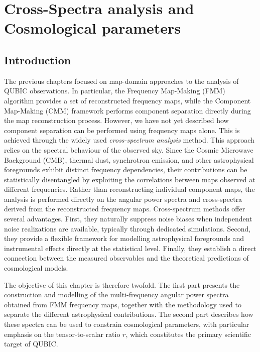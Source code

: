 \documentclass[../../thesis.tex]{subfiles}
\begin{document}
 
\chapter{Cross-Spectra analysis and Cosmological parameters} \label{chap:xspectrum}

\ifSubfilesClassLoaded{
    \tableofcontents
}{
    \minitoc
}

\section*{Introduction}

The previous chapters focused on map-domain approaches to the analysis of QUBIC observations. In particular, the Frequency Map-Making (FMM) algorithm provides a set of reconstructed frequency maps, while the Component Map-Making (CMM) framework performs component separation directly during the map reconstruction process. However, we have not yet described how component separation can be performed using frequency maps alone. This is achieved through the widely used \emph{cross-spectrum analysis} method.
This approach relies on the spectral behaviour of the observed sky. Since the Cosmic Microwave Background (CMB), thermal dust, synchrotron emission, and other astrophysical foregrounds exhibit distinct frequency dependencies, their contributions can be statistically disentangled by exploiting the correlations between maps observed at different frequencies. Rather than reconstructing individual component maps, the analysis is performed directly on the angular power spectra and cross-spectra derived from the reconstructed frequency maps.
Cross-spectrum methods offer several advantages. First, they naturally suppress noise biases when independent noise realizations are available, typically through dedicated simulations. Second, they provide a flexible framework for modelling astrophysical foregrounds and instrumental effects directly at the statistical level. Finally, they establish a direct connection between the measured observables and the theoretical predictions of cosmological models.

The objective of this chapter is therefore twofold. The first part presents the construction and modelling of the multi-frequency angular power spectra obtained from FMM frequency maps, together with the methodology used to separate the different astrophysical contributions. The second part describes how these spectra can be used to constrain cosmological parameters, with particular emphasis on the tensor-to-scalar ratio $r$, which constitutes the primary scientific target of QUBIC.
\end{document}
